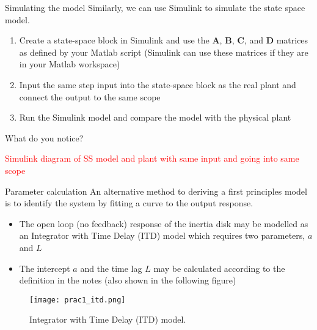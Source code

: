 \documentclass[9pt]{beamer-control}
\begin{document}
\begin{frame}{Simulating the model}
Similarly, we can use Simulink to simulate the state space model.
\begin{enumerate}
	\item Create a state-space block in Simulink and use the $\mathbf{A}$, $\mathbf{B}$, $\mathbf{C}$, and $\mathbf{D}$ matrices as defined by your Matlab script (Simulink can use these matrices if they are in your Matlab workspace)
	\item Input the same step input into the state-space block as the real plant and connect the output to the same scope
	\item Run the Simulink model and compare the model with the physical plant
\end{enumerate}

What do you notice?


\textcolor{red}{Simulink diagram of SS model and plant with same input and going into same scope}

\end{frame}





\begin{frame}{Parameter calculation}
An alternative method to deriving a first principles model is to identify the system by fitting a curve to the output response. 

\begin{itemize}
	\item The open loop (no feedback) response of the inertia disk may be modelled as an Integrator with Time Delay (ITD) model which requires two parameters, $a$ and $L$
	\item The intercept $a$ and the time lag $L$ may be calculated according to the definition in the notes (also shown in the following figure)
\end{itemize}


\end{frame}

\begin{frame}
	\begin{figure}
		\centering
		\texttt{[image: prac1\_itd.png]}
		\caption{Integrator with Time Delay (ITD) model.}
	\end{figure}
\end{frame}
\end{document}
